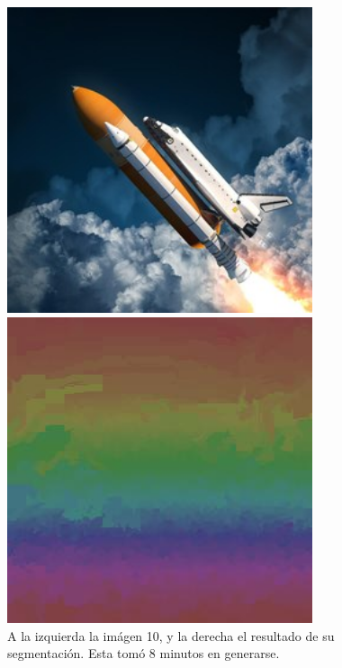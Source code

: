 \documentclass[letterpaper,11pt]{article} %
\begin{document}
      \begin{figure}[H]
        \centering
        \begin{minipage}{0.4\textwidth}
          \includegraphics[width=0.8\textwidth]{images/image_10}
        \end{minipage}
        \begin{minipage}{0.4\textwidth}
          \includegraphics[width=0.8\textwidth]{images/result_image10}
        \end{minipage}
        \caption{A la izquierda la imágen 10, y la derecha el resultado de su segmentación. Esta tomó 8 minutos en generarse.}
      \end{figure}
\end{document}
